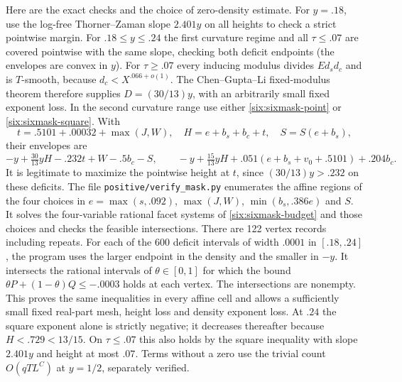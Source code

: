 \documentclass[11pt,a4paper]{article}
\theoremstyle{paperplain}
\numberwithin{equation}{section}
\begin{document}
Here are the exact checks and the choice of zero-density estimate.
For $y=.18$, use the log-free Thorner--Zaman slope $2.401y$
on all heights to check a strict pointwise margin. For
$.18\le y\le .24$ the first curvature regime and all $\tau\le.07$
are covered pointwise with the same slope, checking both deficit
endpoints (the envelopes are convex in $y$).
For $\tau\ge .07$ every inducing modulus divides $E d_sd_c$
and is $T$-smooth, because $d_c<X^{.066+o(1)}$.
The Chen--Gupta--Li fixed-modulus theorem therefore supplies
$D=(30/13)y$, with an arbitrarily small fixed exponent loss.
In the second curvature range use either \eqref{six:sixmask-point}
or \eqref{six:sixmask-square}. With
\[
 t=.5101+.00032+\max(J,W),\quad H=e+b_s+b_c+t,\quad
 S=S(e+b_s),
\]
their envelopes are
\[
 -y+\tfrac{30}{13}yH-.232t+W-.5b_c-S,\qquad
 -y+\tfrac{15}{13}yH+.051(e+b_s+v_0+.5101)+.204b_c .
\]
It is legitimate to maximize the pointwise height at $t$,
since $(30/13)y>.232$ on these deficits.
The file \texttt{positive/verify\_mask.py} enumerates the affine
regions of the four choices in $e=\max(s,.092)$, $\max(J,W)$,
$\min(b_s,.386e)$ and $S$. It solves the four-variable rational
facet systems of \eqref{six:sixmask-budget} and those choices and
checks the feasible intersections. There are 122 vertex records
including repeats. For each of the 600 deficit intervals of width
$.0001$ in $[.18,.24]$, the program uses the larger endpoint in
the density and the smaller in $-y$. It intersects the rational
intervals of $\theta\in[0,1]$ for which the bound
$\theta P+(1-\theta)Q\le -.0003$ holds at each vertex. The
intersections are nonempty. This proves the same inequalities in
every affine cell and allows a sufficiently small fixed real-part
mesh, height loss and density exponent loss.
At $.24$ the square exponent alone is strictly negative; it
decreases thereafter because $H<.729<13/15$. On $\tau\le.07$
this also holds by the square inequality with slope $2.401y$
and height at most $.07$. Terms without a zero use the trivial
count $O(qT L^C)$ at $y=1/2$, separately verified.
\end{document}
